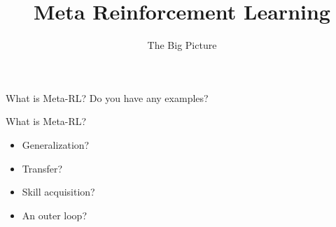 \documentclass[aspectratio=169]{../latex_main/tntbeamer}  %
\title[Meta-RL]{Meta Reinforcement Learning}
\subtitle{The Big Picture}
\begin{document}
	
	\maketitle

\begin{frame}{What is Meta-RL?}
    Do you have any examples?
\end{frame}

\begin{frame}{What is Meta-RL?}
\begin{itemize}
    \item Generalization?
    \item Transfer?
    \item Skill acquisition?
    \item An outer loop?
\end{itemize}
\end{frame}
\end{document}

